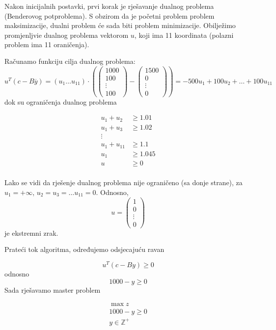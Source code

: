 \documentclass[a4paper, utf8, 11pt, colorlinks]{book}
\begin{document}
 Nakon inicijalnih postavki, prvi korak je rješavanje dualnog problema (Benderovog potproblema). S obzirom da je početni problem problem maksimizacije, dualni problem će sada biti problem minimizacije. Obilježimo promjenljvie dualnog problema vektorom  $u$, koji ima 11 koordinata (polazni problem ima 11 oraničenja).
 
 Računamo funkciju cilja dualnog problema:
 $$
u^T (c-B\overline{y})=(u_1\ldots u_{11})\cdot \left(\left(\begin{array}{c}
	1000 \\
	100 \\
	\vdots \\
	100
\end{array}\right)-\left(\begin{array}{c}
1500 \\
0 \\
\vdots \\
0
\end{array}\right)\right) = -500u_1+100u_2+\ldots+100u_{11}
$$
dok su ograničenja dualnog problema

$$
\begin{aligned}
	u_1+u_2&\geqslant 1.01\\
	u_1+u_3&\geqslant 1.02\\
	\vdots&\\
	u_1+u_{11}&\geqslant 1.1\\
	u_1&\geqslant 1.045\\ 
	u&\geqslant 0\\
\end{aligned}
$$

Lako se vidi da rješenje dualnog problema nije ograničeno (sa donje strane), za $u_1 = +\infty$, $u_2 = u_3=\ldots u_{11}=0$.
Odnosno, 
$$u=\left(\begin{array}{c}
 1 \\
	0 \\
	\vdots \\
	0
\end{array}\right)$$ je ekstremni zrak.

Prateći tok algoritma, određujemo odsjecajuću ravan

$$u^{T}(c-By)\geqslant 0$$
odnosno
$$1000-y\geqslant 0$$
Sada rješavamo master problem

$$
\begin{aligned}
	\max z\\
	1000-y\geqslant 0\\
	y\in\mathbb{Z}^+\\	
	\end{aligned}
$$
\end{document}
